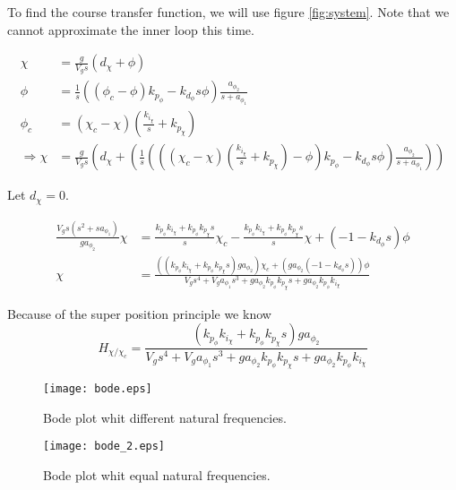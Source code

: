 To find the course transfer function, we will use figure \ref{fig:system}. Note that we cannot approximate the inner loop this time. 
\begin{equations}
    \begin{align*}
    \chi &= \frac{g}{V_gs}(d_\chi + \phi)  \\
    \phi &= \frac{1}{s} ((\phi_c - \phi) k_{p_\phi}- k_{d_\phi}s \phi) \frac{a_{\phi_2}}{s + a_{\phi_1}} \\
    \phi_c &= (\chi_c - \chi)(\frac{k_{i_\chi}}{s} + k_{p_\chi}) \\
    \Rightarrow \chi &= \frac{g}{V_gs}(d_\chi + ( \frac{1}{s} (((\chi_c - \chi)(\frac{k_{i_\chi}}{s} + k_{p_\chi}) - \phi) k_{p_\phi}- k_{d_\phi}s \phi) \frac{a_{\phi_2}}{s + a_{\phi_1}})) 
    \end{align*} 
\end{equations}
Let $d_\chi = 0.$
\begin{equations}
    \begin{align*}
        \frac{V_g s(s^2 + sa_{\phi_1})}{g a_{\phi_2}} \chi &= \frac{k_{p_\phi} k_{i_\chi} + k_{p_\phi} k_{p_\chi}s}{s}\chi_c - \frac{k_{p_\phi} k_{i_\chi} + k_{p_\phi} k_{p_\chi}s}{s} \chi + (-1-k_{d_\phi}s)\phi \\
        \chi &= \frac{((k_{p_\phi} k_{i_\chi} + k_{p_\phi} k_{p_\chi}s) ga_{\phi_2} ) \chi_c + (ga_{\phi_2}(-1-k_{d_\phi}s)) \phi }{V_g s^4 + V_g a_{\phi_1}s^3  + ga_{\phi_2}k_{p_\phi} k_{p_\chi}s+ ga_{\phi_2}k_{p_\phi} k_{i_\chi}}
    \end{align*}
\end{equations}

Because of the super position principle we know 
\begin{equation*}
    H_{\chi/\chi_c} = \frac{(k_{p_\phi} k_{i_\chi} + k_{p_\phi} k_{p_\chi}s) ga_{\phi_2} }{V_g s^4 + V_g a_{\phi_1}s^3  + ga_{\phi_2}k_{p_\phi} k_{p_\chi}s+ ga_{\phi_2}k_{p_\phi} k_{i_\chi}}
\end{equation*}












\begin{figure}[H]
    \centering
    \texttt{[image: bode.eps]}
    \caption{Bode plot whit different natural frequencies. }
    \label{bode}
\end{figure}

\begin{figure}[H]
    \centering
    \texttt{[image: bode\_2.eps]}
    \caption{Bode plot whit equal natural frequencies.}
    \label{bode_2}
\end{figure}

